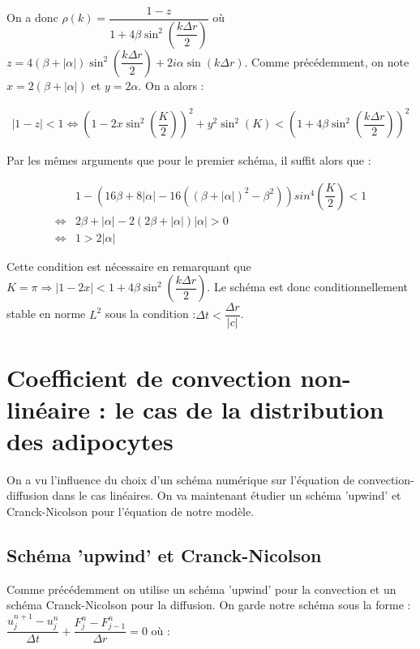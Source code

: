 \documentclass[a4paper,fleqn,leqno]{article}
\begin{document}
On a donc $\rho(k) = \dfrac{1-z}{1 + 4\beta\sin^2(\dfrac{k\Delta r}{2})}$ où $z = 4(\beta + |\alpha|)\sin^2(\dfrac{k\Delta r}{2}) + 2i\alpha\sin(k\Delta r)$. Comme précédemment, on note $x = 2(\beta + |\alpha|)$ et $y = 2\alpha$. On a alors :

\begin{align}
\lvert 1-z\rvert <1\Leftrightarrow (1 -2x\sin^2(\dfrac{K}{2}))^2 + y^2 \sin^2(K) < (1 + 4\beta\sin^2(\dfrac{k\Delta r}{2}))^2
\end{align}

Par les mêmes arguments que pour le premier schéma, il suffit alors que :

\begin{equation*}
\begin{array}{rl}
 & 1 -(16\beta + 8\lvert\alpha\rvert -16((\beta + \lvert\alpha\rvert)^2 - \beta^2))sin^4(\dfrac{K}{2}) < 1\\
\Leftrightarrow & 2\beta + \lvert\alpha\rvert -2(2\beta + \lvert\alpha\rvert)\lvert\alpha\rvert > 0\\
\Leftrightarrow & 1 > 2 \lvert\alpha\rvert
\end{array}
\end{equation*}

Cette condition est nécessaire en remarquant que $K = \pi \Rightarrow \lvert 1 - 2x \rvert < 1 + 4\beta\sin^2(\dfrac{k\Delta r}{2})$.
Le schéma est donc conditionnellement stable en norme $L^2$ sous la condition :$\Delta t < \dfrac{\Delta r}{\lvert c\rvert}$.

\section{Coefficient de convection non-linéaire : le cas de la distribution des adipocytes}

On a vu l'influence du choix d'un schéma numérique sur l'équation de convection-diffusion dans le cas linéaires. On va maintenant étudier un schéma 'upwind' et Cranck-Nicolson pour l'équation de notre modèle.


\subsection{Schéma 'upwind' et Cranck-Nicolson}

Comme précédemment on utilise un schéma 'upwind' pour la convection et un schéma Cranck-Nicolson pour la diffusion. On garde notre schéma sous la forme : $\dfrac{u_j^{n+1} - u_j^n}{\Delta t} +\dfrac{F^n_j - F^n_{j-1}}{\Delta r} = 0$ où :
\end{document}
